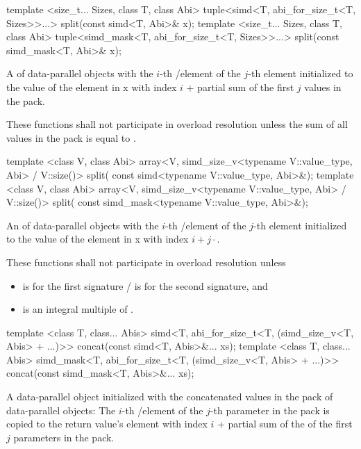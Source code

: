 \begin{itemdecl}
template <size_t... Sizes, class T, class Abi>
tuple<simd<T, abi_for_size_t<T, Sizes>>...> split(const simd<T, Abi>& x);
template <size_t... Sizes, class T, class Abi>
tuple<simd_mask<T, abi_for_size_t<T, Sizes>>...> split(const simd_mask<T, Abi>& x);
\end{itemdecl}
\begin{itemdescr}
  \pnum\returns A  of data-parallel objects with the $i$-th \simd/\mask element of the $j$-th  element initialized to the value of the element in \code x with index $i$ + partial sum of the first $j$ values in the  pack.

  \pnum\remarks These functions shall not participate in overload resolution unless the sum of all values in the  pack is equal to .
\end{itemdescr}

\begin{itemdecl}
template <class V, class Abi>
array<V, simd_size_v<typename V::value_type, Abi> / V::size()> split(
    const simd<typename V::value_type, Abi>&);
template <class V, class Abi>
array<V, simd_size_v<typename V::value_type, Abi> / V::size()> split(
    const simd_mask<typename V::value_type, Abi>&);
\end{itemdecl}
\begin{itemdescr}
  \pnum\returns An  of data-parallel objects with the $i$-th \simd/\mask element of the $j$-th  element initialized to the value of the element in \code x with index $i + j \cdot $.

  \pnum\remarks These functions shall not participate in overload resolution unless
  \begin{itemize}
    \item {} is \true for the first signature /  is \true for the second signature, and
    \item {} is an integral multiple of .
  \end{itemize}
\end{itemdescr}

\begin{itemdecl}
template <class T, class... Abis>
simd<T, abi_for_size_t<T, (simd_size_v<T, Abis> + ...)>> concat(const simd<T, Abis>&... xs);
template <class T, class... Abis>
simd_mask<T, abi_for_size_t<T, (simd_size_v<T, Abis> + ...)>> concat(const simd_mask<T, Abis>&... xs);
\end{itemdecl}
\begin{itemdescr}
  \pnum\returns A data-parallel object initialized with the concatenated values in the  pack of data-parallel objects:
  The $i$-th \simd/\mask element of the $j$-th parameter in the  pack is copied to the return value's element with index $i$ + partial sum of the  of the first $j$ parameters in the  pack.
\end{itemdescr}

